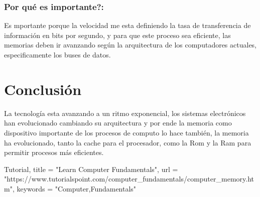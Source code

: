\documentclass{article}
\begin{document}
\subsubsection{Por qué es importante?:}
Es mportante porque la velocidad me esta definiendo la tasa de transferencia de información en bits por segundo, y para que este proceso sea eficiente, las memorias deben ir avanzando según la arquitectura de los computadores actuales, especificamente los buses de datos.


\newpage
\section{Conclusión} \label{conclulsion}

La tecnología esta avanzando a un ritmo exponencial, los sistemas electrónicos han evolucionado cambiando su arquitectura y por ende la memoria como dispositivo importante de los procesos de computo lo hace también, la memoria ha evolucionado, tanto la cache para el procesador, como la Rom y la Ram para permitir procesos más eficientes.
\newpage


{Tutorial,
   title = "Learn Computer Fundamentals",
   url  = "https://www.tutorialspoint.com/computer_fundamentals/computer_memory.htm",
   keywords  = "Computer,Fundamentals"
}
\end{document}
